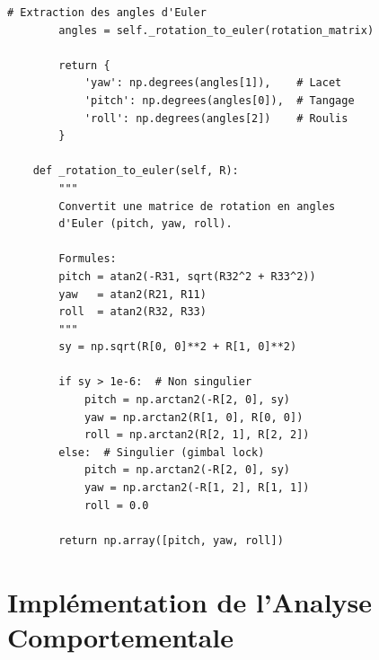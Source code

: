 \documentclass[12pt,a4paper,twoside]{report}
\begin{document}
\begin{lstlisting}[style=pythonstyle, caption={Module d'estimation de la pose de la tête.}, label={lst:head_pose}]
        # Extraction des angles d'Euler
        angles = self._rotation_to_euler(rotation_matrix)
        
        return {
            'yaw': np.degrees(angles[1]),    # Lacet
            'pitch': np.degrees(angles[0]),  # Tangage
            'roll': np.degrees(angles[2])    # Roulis
        }
    
    def _rotation_to_euler(self, R):
        """
        Convertit une matrice de rotation en angles 
        d'Euler (pitch, yaw, roll).
        
        Formules:
        pitch = atan2(-R31, sqrt(R32^2 + R33^2))
        yaw   = atan2(R21, R11)
        roll  = atan2(R32, R33)
        """
        sy = np.sqrt(R[0, 0]**2 + R[1, 0]**2)
        
        if sy > 1e-6:  # Non singulier
            pitch = np.arctan2(-R[2, 0], sy)
            yaw = np.arctan2(R[1, 0], R[0, 0])
            roll = np.arctan2(R[2, 1], R[2, 2])
        else:  # Singulier (gimbal lock)
            pitch = np.arctan2(-R[2, 0], sy)
            yaw = np.arctan2(-R[1, 2], R[1, 1])
            roll = 0.0
        
        return np.array([pitch, yaw, roll])
\end{lstlisting}

\section{Implémentation de l'Analyse Comportementale}
\end{document}
